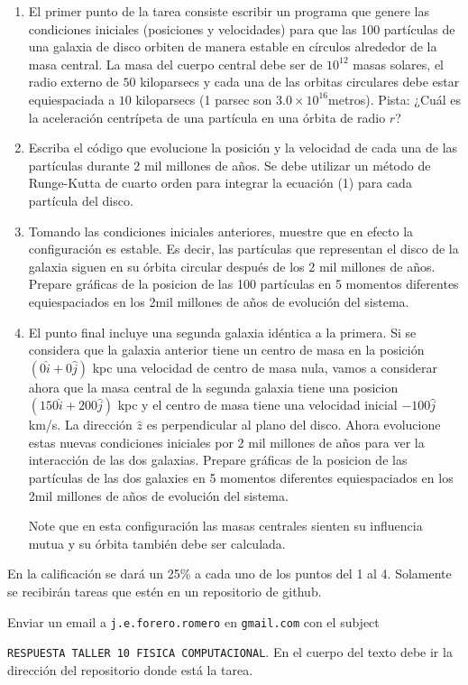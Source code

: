 \documentclass{article}
\begin{document}
\begin{enumerate}
\item El primer punto de la tarea consiste escribir un programa que genere
  las condiciones  iniciales (posiciones y velocidades) para que las
  100 part\'iculas de una galaxia de disco orbiten de manera estable
  en c\'irculos alrededor de la masa  central. La masa del cuerpo
  central debe ser de $10^{12}$ masas solares, el radio externo de
  $50$ kiloparsecs y cada una de las orbitas circulares debe estar
  equiespaciada a $10$ kiloparsecs (1 parsec son
  $3.0\times10^{16}$metros).  
Pista: ¿Cu\'al es la aceleraci\'on centr\'ipeta de una part\'icula en una
\'orbita de radio $r$?
\item 
  Escriba el c\'odigo que evolucione la posici\'on y la velocidad de
  cada una de las part\'iculas durante 2 mil millones de
  a\~nos.  Se debe utilizar un m\'etodo de Runge-Kutta de cuarto orden
  para integrar la ecuaci\'on (1) para cada part\'icula del disco. 
\item 
  Tomando las condiciones iniciales anteriores, muestre que en efecto
  la configuraci\'on es estable. Es decir, las part\'iculas que
  representan el disco de la galaxia siguen en su \'orbita circular
  despu\'es de los 2 mil millones de a\~nos. Prepare gr\'aficas de la posicion de
  las 100 part\'iculas en 5 momentos diferentes equiespaciados en los
  2mil millones de a\~nos de evoluci\'on del sistema.
\item 
  El punto final incluye una segunda galaxia id\'entica a la
  primera. Si se considera que la galaxia anterior tiene un centro de
  masa en la posici\'on $(0\hat{i}+0\hat{j})$ kpc una velocidad de centro de
  masa nula, vamos a considerar ahora que la masa central de la segunda galaxia
  tiene una posicion $(150\hat{i}+200\hat{j})$ kpc y el centro de masa
  tiene una velocidad inicial $-100\hat{j}$ km/s. La
  direcci\'on $\hat{z}$ es perpendicular al plano del disco. Ahora
  evolucione estas nuevas condiciones iniciales por 2 mil millones de
  a\~nos para ver la interacci\'on de las dos galaxias.  Prepare gr\'aficas de la posicion de
  las part\'iculas de las dos galaxies en 5 momentos diferentes equiespaciados en los  2mil millones de a\~nos de evoluci\'on del sistema.

  Note que en esta configuraci\'on las masas centrales sienten su
  influencia mutua y su \'orbita tambi\'en debe ser calculada.

\end{enumerate}



En la calificaci\'on se dar\'a un 25\% a cada uno de los puntos del 1
al 4. Solamente se recibir\'an tareas que est\'en en un repositorio de
github. 

Enviar un email a {\tt  j.e.forero.romero} en {\tt gmail.com} con el
subject


\verb"RESPUESTA TALLER 10 FISICA COMPUTACIONAL". En el cuerpo del texto
debe ir la direcci\'on del repositorio donde est\'a la tarea.  
\end{document}
